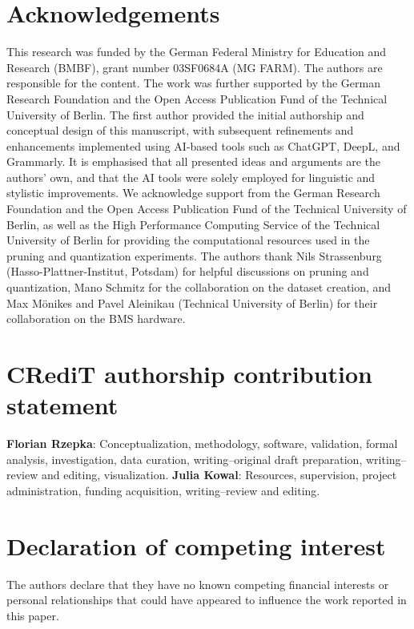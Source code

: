 \documentclass[review]{elsarticle}
\begin{document}
\section*{Acknowledgements}
This research was funded by the German Federal Ministry for Education and Research (BMBF), grant number 03SF0684A (MG FARM). The authors are responsible for the content. The work was further supported by the German Research Foundation and the Open Access Publication Fund of the Technical University of Berlin.
The first author provided the initial authorship and conceptual design of this manuscript, with subsequent refinements and enhancements implemented using AI-based tools such as ChatGPT, DeepL, and Grammarly. It is emphasised that all presented ideas and arguments are the authors’ own, and that the AI tools were solely employed for linguistic and stylistic improvements. We acknowledge support from the German Research Foundation and the Open Access Publication Fund of the Technical University of Berlin, as well as the High Performance Computing Service of the Technical University of Berlin for providing the computational resources used in the pruning and quantization experiments. The authors thank Nils Strassenburg (Hasso-Plattner-Institut, Potsdam) for helpful discussions on pruning and quantization, Mano Schmitz for the collaboration on the dataset creation, and Max Mönikes and Pavel Aleinikau (Technical University of Berlin) for their collaboration on the BMS hardware.

\section*{CRediT authorship contribution statement}
\textbf{Florian Rzepka}: Conceptualization, methodology, software, validation, formal analysis, investigation, data curation, writing--original draft preparation, writing--review and editing, visualization.
\textbf{Julia Kowal}: Resources, supervision, project administration, funding acquisition, writing--review and editing.

\section*{Declaration of competing interest}
The authors declare that they have no known competing financial interests or personal relationships that could have appeared to influence the work reported in this paper.
\end{document}
